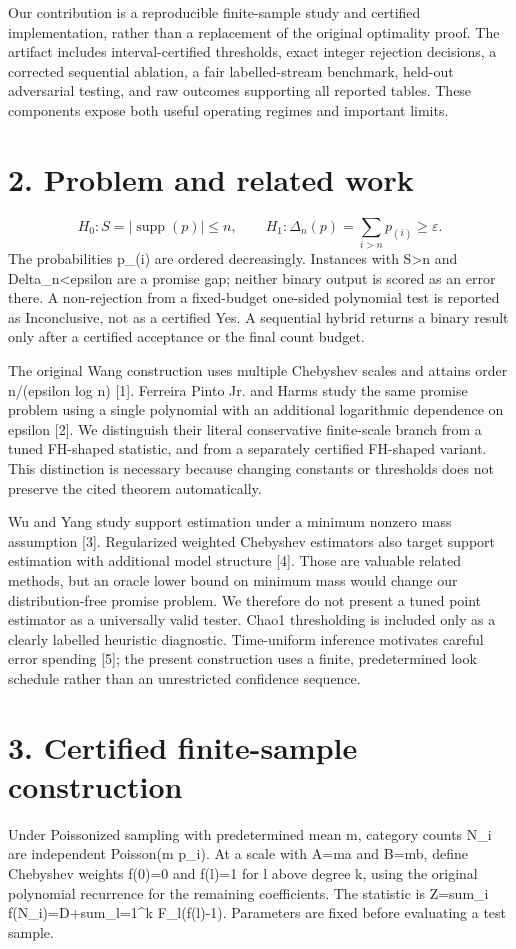 \documentclass[10pt]{article}
\begin{document}
Our contribution is a reproducible finite-sample study and certified implementation, rather than a replacement of the original optimality proof. The artifact includes interval-certified thresholds, exact integer rejection decisions, a corrected sequential ablation, a fair labelled-stream benchmark, held-out adversarial testing, and raw outcomes supporting all reported tables. These components expose both useful operating regimes and important limits.

\section*{2. Problem and related work}
\[
H_0:S=|\operatorname{supp}(p)|\le n,\qquad H_1:\Delta_n(p)=\sum_{i>n}p_{(i)}\ge\varepsilon.
\]
The probabilities p\_(i) are ordered decreasingly. Instances with S>n and Delta\_n<epsilon are a promise gap; neither binary output is scored as an error there. A non-rejection from a fixed-budget one-sided polynomial test is reported as Inconclusive, not as a certified Yes. A sequential hybrid returns a binary result only after a certified acceptance or the final count budget.

The original Wang construction uses multiple Chebyshev scales and attains order n/(epsilon log n) [1]. Ferreira Pinto Jr. and Harms study the same promise problem using a single polynomial with an additional logarithmic dependence on epsilon [2]. We distinguish their literal conservative finite-scale branch from a tuned FH-shaped statistic, and from a separately certified FH-shaped variant. This distinction is necessary because changing constants or thresholds does not preserve the cited theorem automatically.

Wu and Yang study support estimation under a minimum nonzero mass assumption [3]. Regularized weighted Chebyshev estimators also target support estimation with additional model structure [4]. Those are valuable related methods, but an oracle lower bound on minimum mass would change our distribution-free promise problem. We therefore do not present a tuned point estimator as a universally valid tester. Chao1 thresholding is included only as a clearly labelled heuristic diagnostic. Time-uniform inference motivates careful error spending [5]; the present construction uses a finite, predetermined look schedule rather than an unrestricted confidence sequence.

\section*{3. Certified finite-sample construction}
Under Poissonized sampling with predetermined mean m, category counts N\_i are independent Poisson(m p\_i). At a scale with A=ma and B=mb, define Chebyshev weights f(0)=0 and f(l)=1 for l above degree k, using the original polynomial recurrence for the remaining coefficients. The statistic is Z=sum\_i f(N\_i)=D+sum\_{l=1}^k F\_l(f(l)-1). Parameters are fixed before evaluating a test sample.
\end{document}
